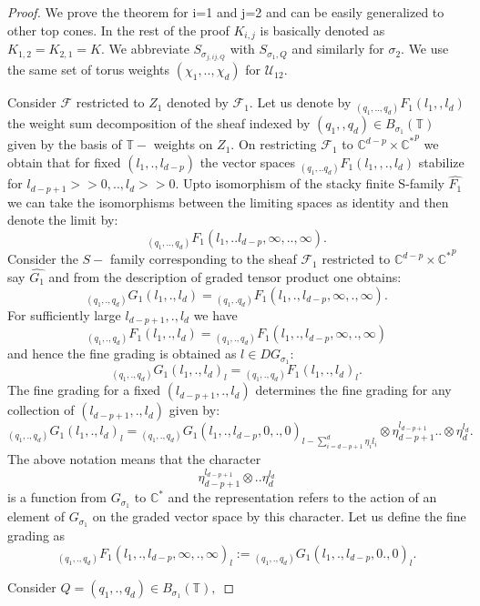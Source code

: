 \documentclass[10pt]{amsart}
\numberwithin{equation}{subsection}
\begin{document}
\begin{proof}
We prove the theorem for i=1 and j=2 and can be easily generalized to other top cones. In the rest of the proof $K_{i,j}$ is basically denoted as $K_{1,2}=K_{2,1}=K.$
We abbreviate $S_{\sigma_{j,ij,Q}}$ with $S_{\sigma_1,Q}$ and similarly for $\sigma_2.$ We use the same set of torus weights $(\chi_1,..,\chi_d)$ for $\mathscr{U}_{12}.$\par 
Consider $\mathscr{F}$ restricted to $Z_1$ denoted by $\mathscr{F}_1.$ Let us denote by ${}_{(q_1,..,q_d)}F_1(l_1,,l_d)$ the weight sum decomposition of the sheaf indexed by $(q_1,,q_d)\in B_{\sigma_{1}}(\mathbb{T})$ given by the basis of $\mathbb{T}-$ weights on $Z_1.$ On restricting $\mathscr{F}_1$ to $\mathbb{C}^{d-p}\times \mathbb{C^*}^p$ we obtain that for fixed $(l_1,.,l_{d-p})$ the vector spaces ${}_{(q_1,..q_d)}F_1(l_1,,.,l_d)$ stabilize for $l_{d-p+1}>>0,..,l_{d}>>0.$
Upto isomorphism of the stacky finite S-family $\hat{F_1}$ we can take the isomorphisms between the limiting spaces as identity and then denote the limit by: $${}_{(q_1,..,q_d)}F_1(l_1,..l_{d-p},\infty,..,\infty).$$ Consider the $S-$ family corresponding to the sheaf $\mathscr{F}_1$ restricted to $\mathbb{C}^{d-p}\times \mathbb{C^*}^p$ say $\hat{G_1}$ and from the description of graded tensor product one obtains:
$${}_{(q_1,.,q_d)}G_{1}(l_1,.,l_d)={}_{(q_1,.q_d)}F_{1}(l_1,.,l_{d-p},\infty,.,\infty).$$ For sufficiently large $l_{d-p+1},.,l_d$ we have $${}_{(q_1,.,q_d)}F_1(l_1,.,l_d)={}_{(q_1,.,q_d)}F_1(l_1,.,l_{d-p},\infty,.,\infty)$$ and hence the fine grading is obtained as $l\in DG_{\sigma_1}$:
$${}_{(q_1,.,q_d)}G_{1}(l_1,.,l_d)_l={}_{(q_1,.,q_d)}F_{1}(l_1,.,l_d)_l.$$ The fine grading for a fixed $(l_{d-p+1},.,l_{d})$ determines the fine grading for any collection of $(l_{d-p+1},.,l_{d})$ given by:
$${}_{(q_1,.,q_d)}G_1(l_1,.,l_d)_{l}={}_{(q_1,.,q_d)}G_1(l_1,.,l_{d-p},0,.,0)_{l-\sum_{i=d-p+1}^{d}\eta_il_i}\otimes \eta_{d-p+1}^{l_{d-p+1}}..\otimes \eta_{d}^{l_{d}}.$$
The above notation means that the character $$\eta_{d-p+1}^{l_{d-p+1}}\otimes.. \eta_{d}^{l_{d}}$$ is a function from $G_{\sigma_{1}}$ to $\mathbb{C}^{*}$ and the representation refers to the action of an element of $G_{\sigma_{1}}$ on the graded vector space by this character.
Let us define the fine grading as $${}_{(q_1,.,q_d)}F_1(l_1,.,l_{d-p},\infty,.,\infty)_{l}:={}_{(q_1,.,q_d)}G_{1}(l_1,.,l_{d-p},0.,0)_{l}.$$\par
Consider $Q=(q_1,.,q_d)\in B_{\sigma_1}(\mathbb{T}),$ %

\end{proof}
\end{document}
